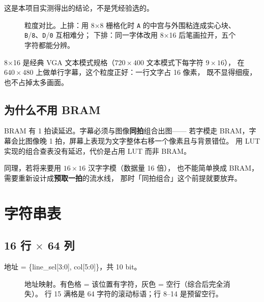 \documentclass[10pt,a4paper]{article}
\newcommand{\code}[1]{{\ttfamily\small #1}}
\begin{document}
这是本项目实测得出的结论，不是凭经验选的。

\begin{figure}[htbp]
\centering
\small

\caption{粒度对比。上排：用 8×8 栅格化时 \texttt{A} 的中宫与外围粘连成实心块、
\texttt{B}/\texttt{8}、\texttt{D}/\texttt{0} 互相难分；
下排：同一字体改用 8×16 后笔画拉开，五个字符都能分辨。}
\label{fig:granularity}
\end{figure}

8×16 是经典 VGA 文本模式规格（$720\times400$ 文本模式下每字符 $9\times16$），
在 $640\times480$ 上做单行字幕，这个粒度正好：一行文字占 16 像素，
既不显得细瘦，也不占掉太多画面。

\subsection{为什么不用 BRAM}

BRAM 有 1 拍读延迟。字幕必须与图像\textbf{同拍}组合出图——
若字模走 BRAM，字幕会比图像晚 1 拍，屏幕上表现为文字整体右移一个像素且与背景错位。
用 LUT 实现的组合查表没有延迟，代价是占用 LUT 而非 BRAM。

同理，若将来要用 $16\times16$ 汉字字模（数据量 16 倍），
也不能简单换成 BRAM，需要重新设计成\textbf{预取一拍}的流水线，
那时「同拍组合」这个前提就要放弃。

\section{字符串表}
\label{sec:strings}

\subsection{\texorpdfstring{16 行 $\times$ 64 列}{16 行 × 64 列}}

地址 = \code{\{line\_sel[3:0], col[5:0]\}}，共 10 bit。

\begin{figure}[htbp]
\centering
\small

\caption{地址映射。有色格 = 该位置有字符，灰色 = 空行（综合后完全消失）。
行 15 满格是 64 字符的滚动标语；行 8--14 是预留空行。}
\label{fig:stringsmap}
\end{figure}
\end{document}
